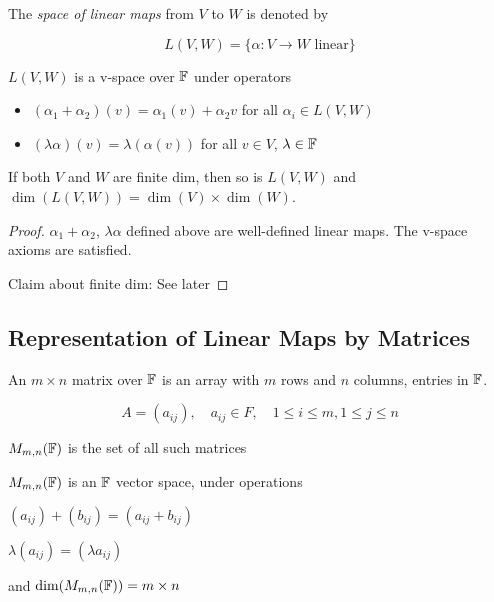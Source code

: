 \documentclass[a4paper]{article}
\begin{document}
\begin{defi}
	The \emph{space of linear maps} from $ V $ to $ W $ is denoted by 
	
	\[ L(V,W) = \{ \alpha : V \to W \text{ linear}\} \]
\end{defi}

\begin{prop} 
	$ L(V,W) $ is a v-space over $ \mathbb{F} $ under operators
	
	\begin{itemize}
		\item $ (\alpha_{1} + \alpha_{2})(v) = \alpha_{1} (v) + \alpha_{2} v $ for all $ \alpha_{i} \in L(V,W) $
		\item $ (\lambda \alpha  ) (v) = \lambda ( \alpha (v)) $ for all $ v \in V $, $ \lambda \in \mathbb{F} $
	\end{itemize}


If both $ V $ and $ W $ are finite dim, then so is $ L(V,W) $ and $ \dim (L(V,W))  = \dim(V) \times \dim(W) $.

\end{prop}

\begin{proof}
	$ \alpha_{1} + \alpha_{2} $, $ \lambda \alpha $ defined above are well-defined linear maps. The v-space axioms are satisfied.
	
	Claim about finite dim: See later
\end{proof}

\subsection{Representation of Linear Maps by Matrices }


\begin{defi}
	An $ m \times n $ matrix over $ \mathbb{F} $ is an array with $ m $ rows and $ n $ columns, entries in $ \mathbb{F} $.
	
	\[ A = (a_{ij}), \quad a_{ij} \in F, \quad 1 \leq i \leq m, 1 \leq j \leq n \]
	
	$ M_{m,n}(\mathbb{F}) $ is the set of all such matrices
\end{defi}

\begin{prop} $ M_{m,n}(\mathbb{F}) $ is an $ \mathbb{F} $ vector space, under operations
	
	\item $ (a_{ij}) + (b_{ij}) = (a_{ij} + b_{ij}) $
	\item $ \lambda(a_{ij}) = (\lambda a_{ij}) $
	\item and $ \dim (M_{m,n}(\mathbb{F})) = m \times n $
	
\end{prop}
\end{document}
